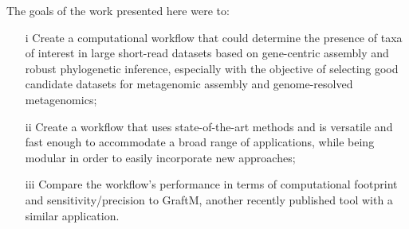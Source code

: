 \documentclass{bioinfo}
\begin{document}
The goals of the work presented here were to: 
\begin{enumerate}
\item[i] Create a computational workflow that could determine the presence of taxa of interest in large short-read datasets based on gene-centric assembly and robust phylogenetic inference, especially with the objective of selecting good candidate datasets for metagenomic assembly and genome-resolved metagenomics;
\item[ii] Create a workflow that uses state-of-the-art methods and is versatile and fast enough to accommodate a broad range of applications, while being modular in order to easily incorporate new approaches;
\item[iii] Compare the workflow’s performance in terms of computational footprint and sensitivity/precision to GraftM, another recently published tool with a similar application.
\end{enumerate}
\end{document}
